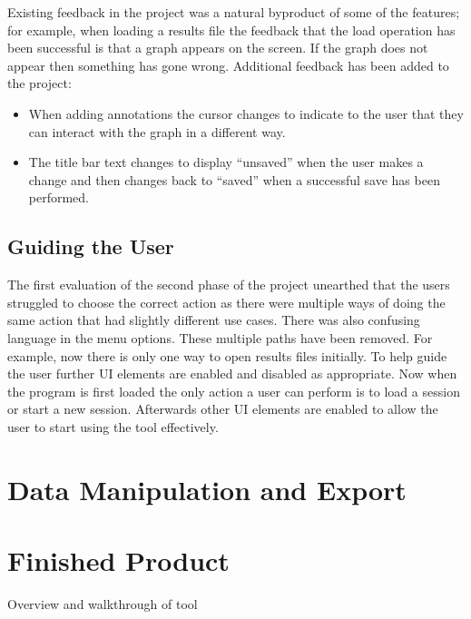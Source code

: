 Existing feedback in the project was a natural byproduct of some of the features; for example, when loading a results file the feedback that the load operation has been successful is that a graph appears on the screen. If the graph does not appear then something has gone wrong.  Additional feedback has been added to the project:
\begin{itemize}
\item When adding annotations the cursor changes to indicate to the user that they can interact with the graph in a different way.
\item The title bar text changes to display ``unsaved'' when the user makes a change and then changes back to ``saved'' when a successful save has been performed.
\end{itemize}

\subsection{Guiding the User}

The first evaluation of the second phase of the project unearthed that the users struggled to choose the correct action as there were multiple ways of doing the same action that had slightly different use cases.  There was also confusing language in the menu options.  These multiple paths have been removed. For example, now there is only one way to open results files initially.  To help guide the user further \ac{UI} elements are enabled and disabled as appropriate.  Now when the program is first loaded the only action a user can perform is to load a session or start a new session.  Afterwards other \ac{UI} elements are enabled to allow the user to start using the tool effectively.

\section{Data Manipulation and Export}

\section{Finished Product}
Overview and walkthrough of tool
